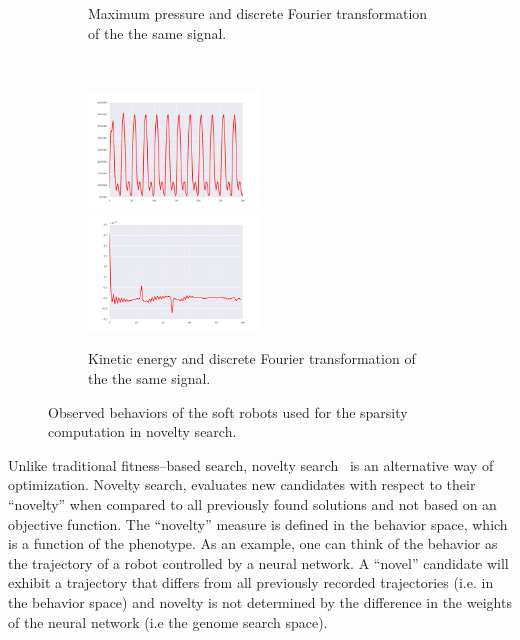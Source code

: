 \documentclass{sig-alternate}
\begin{document}
\begin{figure}[t!]
\begin{subfigure}[b]{0.23\textwidth}
\caption{Maximum pressure and discrete Fourier transformation of the the same signal.}
\end{subfigure}~
\begin{subfigure}[b]{0.23\textwidth}
\centering
\includegraphics[width=0.5\textwidth]{../Figures/Behaviors/ke.pdf}~
\includegraphics[width=0.5\textwidth]{../Figures/Behaviors/kedft.pdf}
\caption{Kinetic energy and discrete Fourier transformation of the the same signal.}
\end{subfigure}
\caption{Observed behaviors of the soft robots used for the sparsity computation in novelty search.}
\label{fig:Behaviors}
\end{figure}

Unlike traditional fitness--based search, novelty search~\cite{lehman2008exploiting,lehman2011abandoning,lehman2010revising, risi2009novelty} is an alternative way of optimization. Novelty search, evaluates new candidates with respect to their ``novelty'' when compared to all previously found solutions and not based on an objective function. The ``novelty'' measure is defined in the behavior space, which is a function of the phenotype. As an example, one can think of the behavior as the trajectory of a robot controlled by a neural network. A ``novel'' candidate will exhibit a trajectory that differs from all previously recorded trajectories (i.e. in the behavior space) and novelty is not determined by the difference in the weights of the neural network (i.e the genome search space).

\end{document}
